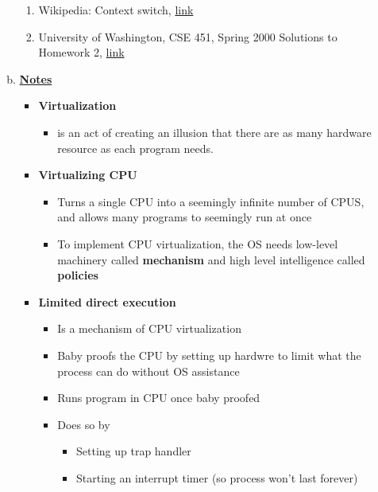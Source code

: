 \documentclass[12pt]{article}
\begin{document}
\begin{enumerate}[1.]
\begin{enumerate}[a)]
        \begin{enumerate}[1)]
            \item Wikipedia: Context switch, \href{https://en.wikipedia.org/wiki/Context_switch}{link}
            \item University of Washington, CSE 451, Spring 2000 Solutions to Homework 2, \href{https://courses.cs.washington.edu/courses/cse451/00sp/homeworks/hw2soln.txt}{link}
        \end{enumerate}

        \item

        \bigskip

        \underline{\textbf{Notes}}

        \begin{itemize}
            \item \textbf{Virtualization}

            \begin{itemize}
                \item is an act of creating an illusion that there are as many hardware resource as each program needs.
            \end{itemize}

            \item \textbf{Virtualizing CPU}

            \begin{itemize}
                \item Turns a single CPU into a seemingly infinite number of CPUS, and
                allows many programs to seemingly run at once
                \item To implement CPU virtualization, the OS needs low-level machinery
                called \textbf{mechanism} and high level intelligence called \textbf{policies}

                \bigskip
            \end{itemize}

            \item \textbf{Limited direct execution}

            \begin{itemize}
                \item Is a mechanism of CPU virtualization
                \item Baby proofs the CPU by setting up hardwre to limit what the process can do without OS assistance
                \item Runs program in CPU once baby proofed
                \item Does so by
                \begin{itemize}
                    \item Setting up trap handler
                    \item Starting an interrupt timer (so process won't last forever)
                \end{itemize}
            \end{itemize}


\end{itemize}
\end{enumerate}
\end{enumerate}
\end{document}
